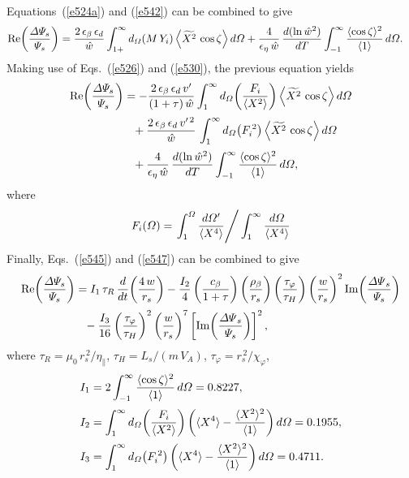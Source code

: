 \documentclass[12pt,prb,aps]{revtex4-1}
\begin{document}
Equations~(\ref{e524a}) and (\ref{e542}) can be combined to give
\begin{align}
{\rm Re}\!\left(\frac{{\mit\Delta}{\mit\Psi}_s}{{\mit\Psi}_s}\right)&= \frac{2\,\epsilon_\beta\,\epsilon_d}{\hat{w}}
\int_{1+}^\infty d_{\mit\Omega}(M\,Y_i)\left\langle\widetilde{X^2}\,\cos\zeta\right\rangle d{\mit\Omega}
+\frac{4}{\epsilon_\eta\,\hat{w}}\,\frac{d(\ln \hat{w}^2)}{dT}\int_{-1}^\infty \frac{\langle \cos\zeta\rangle^2}{\langle 1\rangle}\,d{\mit\Omega}. 
\end{align}
Making use of Eqs.~(\ref{e526}) and (\ref{e530}), the previous equation yields
\begin{align}
{\rm Re}\!\left(\frac{{\mit\Delta}{\mit\Psi}_s}{{\mit\Psi}_s}\right)&= -\frac{2\,\epsilon_\beta\,\epsilon_d\,v'}{(1+\tau)\,\hat{w}}
\int_1^\infty d_{\mit\Omega}\!\left(\frac{F_i}{\langle X^2\rangle}\right)\left\langle\widetilde{X^2}\,\cos\zeta\right\rangle d{\mit\Omega}
\nonumber\\[0.5ex]
&\phantom{=}+ \frac{2\,\epsilon_\beta\,\epsilon_d\,v'^{\,2}}{\hat{w}} \,\int_1^\infty d_{\mit\Omega}\!\left(F_i^{\,2}\right)\left\langle\widetilde{X^2}\,\cos\zeta\right\rangle d{\mit\Omega}\nonumber\\[0.5ex]
&\phantom{=}+\frac{4}{\epsilon_\eta\,\hat{w}}\,\frac{d(\ln \hat{w}^2)}{dT}\int_{-1}^\infty \frac{\langle \cos\zeta\rangle^2}{\langle 1\rangle}\,d{\mit\Omega},\label{e547}
\end{align}
where
\begin{equation}
F_i({\mit\Omega})=\left.\int_1^{\mit\Omega}\frac{d{\mit\Omega}'}{\langle X^4\rangle}\right/\int_1^\infty\frac{d{\mit\Omega}}{\langle X^4\rangle}
\end{equation}
Finally, Eqs.~(\ref{e545}) and (\ref{e547})
can be combined to give\,\cite{fw,fw1}
\begin{align}\label{e559}
{\rm Re}\!\left(\frac{{\mit\Delta}{\mit\Psi}_s}{{\mit\Psi}_s}\right)&= I_1\,\tau_R\,\frac{d}{dt}\!\left(\frac{4\,w}{r_s}\right)
- \frac{I_2}{4}\left(\frac{c_\beta}{1+\tau}\right)\left(\frac{\rho_\beta}{r_s}\right)\left(\frac{\tau_\varphi}{\tau_H}\right)\left(\frac{w}{r_s}\right)^2 {\rm Im}\!\left(\frac{{\mit\Delta\Psi}_s}{{\mit\Psi}_s}\right)\nonumber\\[0.5ex]
&\phantom{=} -\frac{I_3}{16}\left(\frac{\tau_\varphi}{\tau_H}\right)^2 \left(\frac{w}{r_s}\right)^7\left[{\rm Im}\!\left(\frac{{\mit\Delta\Psi}_s}{{\mit\Psi}_s}\right)\right]^2, 
\end{align}
where $\tau_R=\mu_0\,r_s^{\,2}/\eta_\parallel$, $\tau_H=L_s/(m\,V_A)$, $\tau_\varphi=r_s^{\,2}/\chi_\varphi$, 
\begin{align}
I_1 &= 2\int_{-1}^\infty \frac{\langle \cos\zeta\rangle^2}{\langle 1\rangle}\,d{\mit\Omega} =0.8227,\\[0.5ex]
I_2&= \int_1^\infty d_{\mit\Omega}\!\left(\frac{F_i}{\langle X^2\rangle}\right)\left(\langle X^4\rangle - \frac{\langle X^2\rangle^2}{\langle 1\rangle}\right)d{\mit\Omega} =0.1955,\\[0.5ex]
I_3&= \int_1^\infty d_{\mit\Omega}\!\left(F_i^{\,2}\right)\left(\langle X^4\rangle - \frac{\langle X^2\rangle^2}{\langle 1\rangle}\right)d{\mit\Omega} =0.4711.
\end{align}
\end{document}
